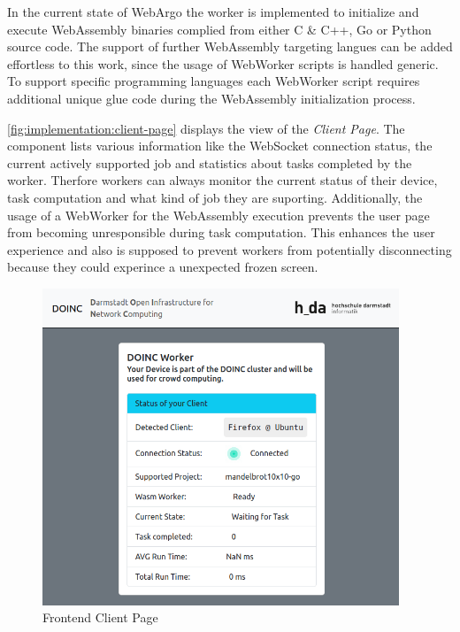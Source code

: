 In the current state of WebArgo the worker is implemented to initialize and execute WebAssembly binaries complied from either C \& C++, Go or Python source code. The support of further WebAssembly targeting langues can be added effortless to this work, since the usage of WebWorker scripts is handled generic. To support specific programming languages each WebWorker script requires additional unique glue code during the WebAssembly initialization process.

\autoref{fig:implementation:client-page} displays the view of the \emph{Client Page}. The component lists various information like the WebSocket connection status, the current actively supported job and statistics about tasks completed by the worker. Therfore workers can always monitor the current status of their device, task computation and what kind of job they are suporting. Additionally, the usage of a WebWorker for the WebAssembly execution prevents the user page from becoming unresponsible during task computation. This enhances the user experience and also is supposed to prevent workers from potentially disconnecting because they could experince a unexpected frozen screen. 
\begin{figure}[htbp]
    \centering
    \includegraphics[width=0.95\textwidth]{gfx/figures/client-page.png}
    \caption{Frontend Client Page}
    \label{fig:implementation:client-page}
\end{figure}

